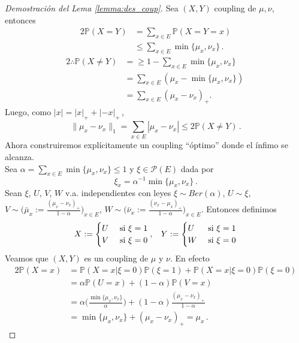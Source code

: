 \documentclass[letterpaper,11pt]{article} %
\def\espacio{\hspace{.25cm}\,}
\theoremstyle{defbreak}
\theoremstyle{propbreak}
\theoremstyle{remark}
\theoremstyle{break}
\def\P{\mathbb{P}}
\def\gris{\color{mygray}}
\begin{document}
\begin{proof}[Demostración del Lema \ref{lemma:des_coup}]  %
\gris Sea $(X,Y)$ coupling de $\mu,\nu$, entonces
\begin{alignat*}{2}
    \P(X=Y) & = \displaystyle\sum_{x\in E}\P(X=Y=x)  \\
     & \leq \displaystyle\sum_{x\in E}\min\{\mu_x,\nu_x\} \, .
\end{alignat*}
\begin{alignat*}{2}
    \therefore \P(X\neq Y) & = \geq 1-\displaystyle \sum_{x\in E}\min\{\mu_x,\nu_x\}  \\
     &  = \displaystyle \sum_{x\in E}(\mu_x-\min\{\mu_x,\nu_x\}) \, \\
     & = \displaystyle\sum_{x\in E}(\mu_x-\nu_x)_+.
\end{alignat*}
Luego, como $|x| = |x|_++|-x|_+$\,,
$$ \|\mu_x-\nu_x\|_1 = \displaystyle\sum_{x\in E}|\mu_x-\nu_x|\leq 2\P(X\neq Y) \, .$$
Ahora construiremos explícitamente un coupling ``óptimo'' donde el ínfimo se alcanza. \\ Sea $\alpha = \displaystyle\sum_{x\in E}\min\{\mu_x,\nu_x\}\leq 1$ y $\xi\in\mathcal{P}(E)$ dada por
$$ \xi_x = \alpha^{-1}\min\{\mu_x,\nu_x\}\, .$$
Sean $\xi$, $U$, $V$, $W$ v.a. independientes con leyes $\xi\sim Ber(\alpha)$, $U\sim\xi$, $V\sim\bigg(\bar{\mu}_x\displaystyle:=\frac{(\mu_x-\nu_x)_+}{1-\alpha}\bigg)_{x\in E}$, $W\sim\bigg(\bar{\nu}_x\displaystyle:=\frac{(\nu_x-\mu_x)_+}{1-\alpha}\bigg)_{x\in E}$. Entonces definimos
$$ X:=\begin{cases}
U & \mbox{ si }\xi=1\\
V & \mbox{ si }\xi=0
\end{cases}, \espacio Y:=\begin{cases}
U & \mbox{ si }\xi=1\\
W & \mbox{ si }\xi=0
\end{cases}$$
Veamos que $(X,Y)$ es un coupling de $\mu$ y $\nu$. En efecto
\begin{alignat*}{2}
    \P(X=x) & = \P(X=x|\xi=0)\P(\xi=1)+\P(X=x|\xi=0)\P(\xi=0) \\
     & = \alpha\P(U=x)+(1-\alpha)\P(V=x) \\
     & = \displaystyle \alpha\bigg(\frac{\min\{\mu_x,\nu_x\}}{\alpha}\bigg)+(1-\alpha)\frac{(\mu_x-\nu_x)_+}{1-\alpha} \\
     & = \min\{\mu_x,\nu_x\}+(\mu_x-\nu_x)_+ = \mu_x \, .
\end{alignat*}

\end{proof}
\end{document}
